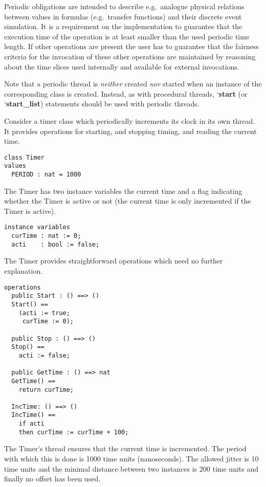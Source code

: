 \documentclass{overturerepchap}
\newcommand{\Lop}[1]{`{\bf\ttfamily #1}\Quote}
\begin{document}
{\begin{description}
Periodic obligations are intended to describe e.g.\
analogue physical relations between values in formulas (e.g.\ transfer
functions) and their discrete event simulation.
It is a requirement on the implementation to
guarantee that the execution time of the operation is at least smaller
than the used periodic time length.
If other operations are present the user has to guarantee that
the fairness criteria for the invocation of these other operations are
maintained by reasoning about the time slices used internally and
available for external invocations.

Note that a periodic thread is \textit{neither} created \textit{nor} started when an instance
of the corresponding class is created. Instead, as with procedural threads,
\Lop{start} (or \Lop{start\_list}) statements should be used with periodic threads.


\item[Examples:]
Consider a timer class which periodically increments its  clock in its
own thread. It provides operations for starting, and stopping timing,
and reading the current time.

\begin{lstlisting}
class Timer
values
  PERIOD : nat = 1000
\end{lstlisting}

The Timer has two instance variables the current time and a flag
indicating whether the Timer is active or not (the current time is
only incremented if the Timer is active).
\begin{lstlisting}
instance variables
  curTime : nat := 0;
  acti    : bool := false;
\end{lstlisting}

The Timer provides straightforward operations which need no further
explanation.
\begin{lstlisting}
operations
  public Start : () ==> ()
  Start() ==
    (acti := true;
     curTime := 0);

  public Stop : () ==> ()
  Stop() ==
    acti := false;

  public GetTime : () ==> nat
  GetTime() ==
    return curTime;

  IncTime: () ==> ()
  IncTime() ==
    if acti
    then curTime := curTime + 100;
\end{lstlisting}

The Timer's thread ensures that the current time is incremented. The period 
with which this is done is 1000 time units (nanoseconds). The allowed jitter is 10 time units
and the minimal distance between two instances is 200 time units and finally
no offset has been used.


\end{description}}
\end{document}

